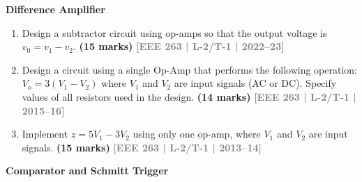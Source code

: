 \documentclass[12pt,a3paper]{article}
\newcommand{\yr}[1]{\hfill\textcolor{gray}{\small\textbf{[#1]}}}
\newcommand{\mk}[1]{\textcolor{orange!70!black}{\small\textbf{(#1 marks)}}}
\newcommand{\subtopic}[2]{%
  \vspace{10pt}
  \noindent\begin{tcolorbox}[colback=#1!8,colframe=#1,boxrule=0.6pt,arc=4pt,
    left=6pt,right=6pt,top=4pt,bottom=4pt]
    \small\bfseries\textcolor{#1}{#2}
  \end{tcolorbox}
  \vspace{2pt}
}
\begin{document}
\subtopic{cE}{Difference Amplifier}
\label{sub:s7-diff}

\begin{enumerate}\item Design a subtractor circuit using op-amps so that the output voltage is $v_0 = v_1 - v_2$.
\mk{15} \yr{EEE 263 | L-2/T-1 | 2022--23}

\item Design a circuit using a single Op-Amp that performs the following operation: $V_o = 3(V_1 - V_2)$ where $V_1$ and $V_2$ are input signals (AC or DC). Specify values of all resistors used in the design.
\mk{14} \yr{EEE 263 | L-2/T-1 | 2015--16}

\item Implement $z = 5V_1 - 3V_2$ using only one op-amp, where $V_1$ and $V_2$ are input signals.
\mk{15} \yr{EEE 263 | L-2/T-1 | 2013--14}

\end{enumerate}

\subtopic{cE}{Comparator and Schmitt Trigger}
\label{sub:s7-schmitt}
\end{document}
